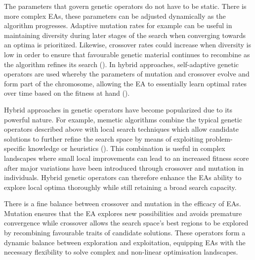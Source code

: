 \parbreak\noindent The parameters that govern genetic operators do not have to be static. There is more complex EAs, these parameters can be adjusted dynamically as the algorithm progresses. Adaptive mutation rates for example can be useful in maintaining diversity during later stages of the search when converging towards an optima is prioritized. Likewise, crossover rates could increase when diversity is low in order to ensure that favourable genetic material continues to recombine as the algorithm refines its search (\cite{meyer2007self}). In hybrid approaches, self-adaptive genetic operators are used whereby the parameters of mutation and crossover evolve and form part of the chromosome, allowing the EA to essentially learn optimal rates over time based on the fitness at hand (\cite{meyer2007self}). 

\parbreak\noindent Hybrid approaches in genetic operators have become popularized due to its powerful nature. For example, memetic algorithms combine the typical genetic operators described above with local search techniques which allow candidate solutions to further refine the search space by means of exploiting problem-specific knowledge or heuristics (\cite{neri2012memetic}). This combination is useful in complex landscapes where small local improvements can lead to an increased fitness score after major variations have been introduced through crossover and mutation in individuals. Hybrid genetic operators can therefore enhance the EAs ability to explore local optima thoroughly while still retaining a broad search capacity.

\parbreak\noindent There is a fine balance between crossover and mutation in the efficacy of EAs. Mutation ensures that the EA explores new possibilities and avoids premature convergence while crossover allows the search space's best regions to be explored by recombining favourable traits of candidate solutions. These operators form a dynamic balance between exploration and exploitation, equipping EAs with the necessary flexibility to solve complex and non-linear optimisation landscapes.

